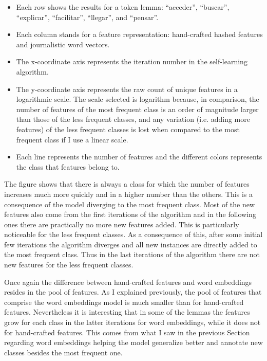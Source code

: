 \begin{itemize}
  \item Each row shows the results for a token lemma: ``acceder'', ``buscar'',
    ``explicar'', ``facilitar'', ``llegar'', and ``pensar''.
  \item Each column stands for a feature representation: hand-crafted hashed
    features and journalistic word vectors.
  \item The x-coordinate axis represents the iteration number in the
    self-learning algorithm.
  \item The y-coordinate axis represents the raw count of unique features in a
    logarithmic scale. The scale selected is logarithm because, in comparison,
    the number of features of the most frequent class is an order of magnitude
    larger than those of the less frequent classes, and any variation (i.e.
    adding more features) of the less frequent classes is lost when compared to
    the most frequent class if I use a linear scale.
  \item Each line represents the number of features and the different colors
    represents the class that features belong to.
\end{itemize}

The figure shows that there is always a class for which the number of features
increases much more quickly and in a higher number than the others. This is a
consequence of the model diverging to the most frequent class. Most of the new
features also come from the first iterations of the algorithm and in the
following ones there are practically no more new features added. This is
particularly noticeable for the less frequent classes. As a consequence of
this, after some initial few iterations the algorithm diverges and all new
instances are directly added to the most frequent class. Thus in the last
iterations of the algorithm there are not new features for the less frequent
classes.

Once again the difference between hand-crafted features and word embeddings
resides in the pool of features. As I explained previously, the pool of
features that comprise the word embeddings model is much smaller than for
hand-crafted features. Nevertheless it is interesting that in some of the
lemmas the features grow for each class in the latter iterations for word
embeddings, while it does not for hand-crafted features. This comes from what I
saw in the previous Section regarding word embeddings helping the model
generalize better and annotate new classes besides the most frequent one.

